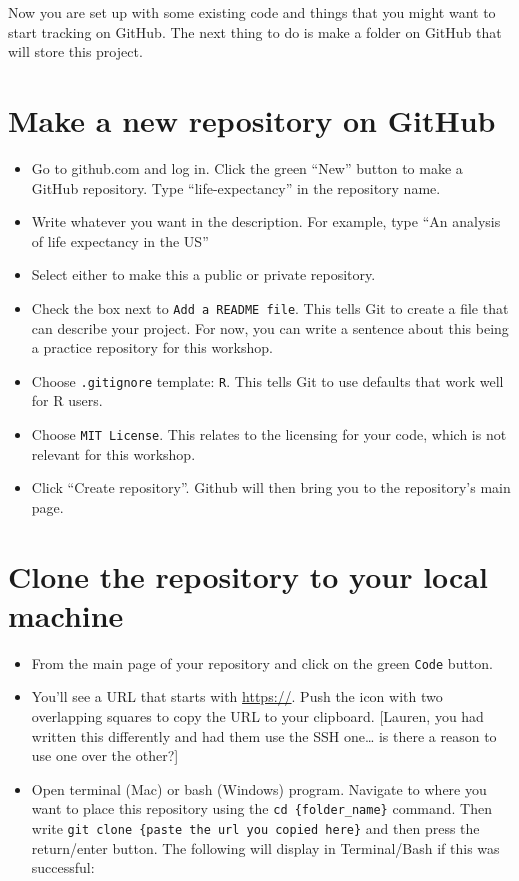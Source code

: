 \documentclass[
]{book}
\providecommand{\tightlist}{%
  \setlength{\itemsep}{0pt}\setlength{\parskip}{0pt}}
\begin{document}
Now you are set up with some existing code and things that you might want to start
tracking on GitHub. The next thing to do is make a folder on GitHub that will
store this project.

\hypertarget{make-a-new-repository-on-github}{%
\section{Make a new repository on GitHub}\label{make-a-new-repository-on-github}}

\begin{itemize}
\tightlist
\item
  Go to github.com and log in. Click the green ``New'' button to make a GitHub
  repository. Type ``life-expectancy'' in the repository name.
\item
  Write whatever you want in the description. For example, type ``An analysis of life expectancy in the US''
\item
  Select either to make this a public or private repository.
\item
  Check the box next to \texttt{Add\ a\ README\ file}. This tells Git to create a file that can describe your project. For now, you can write a sentence about this being a practice repository for this workshop.\\
\item
  Choose \texttt{.gitignore} template: \texttt{R}. This tells Git to use defaults that work well for R users.\\
\item
  Choose \texttt{MIT\ License}. This relates to the licensing for your code, which is not relevant for this workshop.\\
\item
  Click ``Create repository''. Github will then bring you to the repository's
  main page.
\end{itemize}

\hypertarget{clone-the-repository-to-your-local-machine}{%
\section{Clone the repository to your local machine}\label{clone-the-repository-to-your-local-machine}}

\begin{itemize}
\tightlist
\item
  From the main page of your repository and click on the green \texttt{Code} button.\\
\item
  You'll see a URL that starts with \url{https://}. Push the icon with two overlapping
  squares to copy the URL to your clipboard. {[}Lauren, you had written this differently and had them use the SSH one\ldots{} is there a reason to use one over the other?{]}
\item
  Open terminal (Mac) or bash (Windows) program. Navigate to where you want to place
  this repository using the \texttt{cd\ \{folder\_name\}} command. Then write
  \texttt{git\ clone\ \{paste\ the\ url\ you\ copied\ here\}} and
  then press the return/enter button. The following will display in Terminal/Bash
  if this was successful:
\end{itemize}
\end{document}
